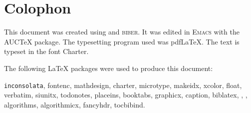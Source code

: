 \chapter*{Colophon}

This document was created using \LaTeXe{} and \textsc{biber}. It was
edited in \textsc{Emacs} with the AUC\TeX{} package. The typesetting
program used was pdf\LaTeX{}. The text is typeset in the font Charter.

The following \LaTeX{} packages were used to produce this document:

\texttt{inconsolata}, fontenc, mathdesign, charter, microtype,
makeidx, xcolor, float, verbatim, siunitx, todonotes, placeins,
booktabs, graphicx, caption, biblatex, \tikzname{},\pgfname{} , algorithms,
algorithmicx, fancyhdr, tocbibind.

